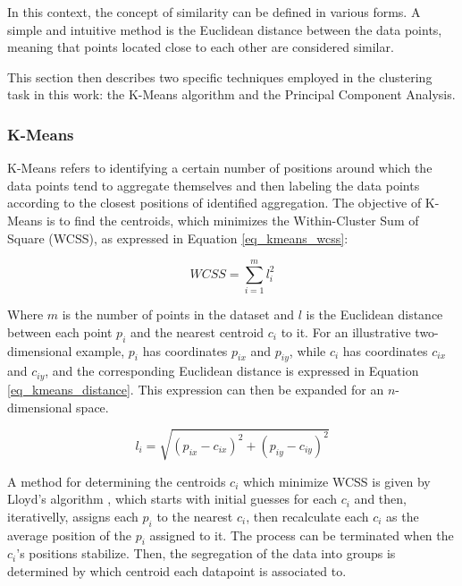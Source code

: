 \documentclass[conference]{IEEEtran}
\begin{document}
In this context, the concept of similarity can be defined in various forms. A simple and intuitive method is the Euclidean distance between the data points, meaning that points located close to each other are considered similar.

This section then describes two specific techniques employed in the clustering task in this work: the K-Means algorithm and the Principal Component Analysis.

\subsubsection{K-Means}

K-Means refers to identifying a certain number of positions around which the data points tend to aggregate themselves and then labeling the data points according to the closest positions of identified aggregation. The objective of K-Means is to find the centroids, which minimizes the Within-Cluster Sum of Square (WCSS), as expressed in Equation \ref{eq_kmeans_wcss}: 


\begin{equation}
	\label{eq_kmeans_wcss}
	WCSS=\sum_{i = 1}^{m} l_{i}^{2}
\end{equation}

Where $m$ is the number of points in the dataset and $l$ is the Euclidean distance between each point $p_{i}$ and the nearest centroid $c_{i}$ to it. For an illustrative two-dimensional example, $p_{i}$ has coordinates $p_{ix}$ and $p_{iy}$, while $c_{i}$ has coordinates $c_{ix}$ and $c_{iy}$, and the corresponding Euclidean distance is expressed in Equation \ref{eq_kmeans_distance}. This expression can then be expanded for an $n$-dimensional space.

\begin{equation}
	\label{eq_kmeans_distance}
	l_{i}=\sqrt{(p_{ix} - c_{ix})^{2} + (p_{iy} - c_{iy})^{2}}
\end{equation}

A method for determining the centroids $c_{i}$ which minimize WCSS is given by Lloyd's algorithm \cite{b3}, which starts with initial guesses for each $c_{i}$ and then, iterativelly, assigns each $p_{i}$ to the nearest $c_{i}$, then recalculate each $c_{i}$ as the average position of the $p_{i}$ assigned to it. The process can be terminated when the $c_{i}$'s positions stabilize. Then, the segregation of the data into groups is determined by which centroid each datapoint is associated to.
\end{document}
